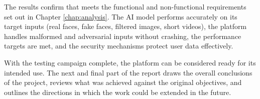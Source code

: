 The results confirm that \deepguard{} meets the functional and non-functional requirements set out in Chapter \ref{chap:analysis}. The AI model performs accurately on its target inputs (real faces, fake faces, filtered images, short videos), the platform handles malformed and adversarial inputs without crashing, the performance targets are met, and the security mechanisms protect user data effectively.

With the testing campaign complete, the platform can be considered ready for its intended use. The next and final part of the report draws the overall conclusions of the project, reviews what was achieved against the original objectives, and outlines the directions in which the work could be extended in the future.
